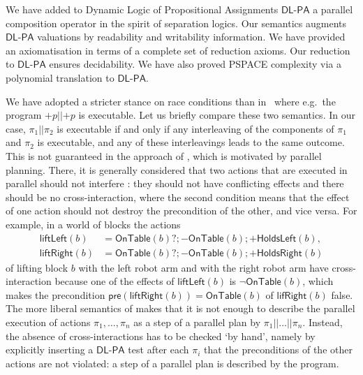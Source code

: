 \documentclass{llncs}
\newcommand{\pll}{ {||} }							%
\newcommand{\Dlpa}{\ensuremath{\mathsf{DL\text{-}PA}}\xspace}
\newcommand{\jb}[1]{\**\marginpar{\textbf{JB:} #1}}
\newcommand{\assgntop}[1]{{\mathtt {+} #1}}
\newcommand{\assgnbot}[1]{{\mathtt {-} #1}}
\begin{document}
We have added to Dynamic Logic of Propositional Assignments \Dlpa
a parallel composition operator in the spirit of separation logics. 
Our semantics augments \Dlpa valuations by readability and writability information. 
We have provided an axiomatisation in terms of a complete set of reduction axioms. 
Our reduction to \Dlpa ensures decidability. 
We have also proved PSPACE complexity via a polynomial translation to \Dlpa. 

We have adopted a stricter stance on race conditions than in~\cite{HerzigEtal-Ijcai19} %
where e.g.~the program $\assgntop p \pll \assgntop p$ is executable. 
Let us briefly compare these two semantics. 
In our case, $\pi_1 \pll \pi_2$ is executable if and only if any interleaving of the components of $\pi_1$ and $\pi_2$ is executable, and any of these interleavings leads to the same outcome. 
This is not guaranteed in the approach of \cite{HerzigEtal-Ijcai19}, which is motivated by parallel planning. 
There, it is generally considered that two actions that are executed in parallel should not interfere \cite{DBLP:journals/ai/BlumF97}:
they should not have conflicting effects and there should be no cross-interaction, where the second condition means that the effect of one action should not destroy the precondition of the other, and vice versa. 
For example, in a world of blocks the actions 
\begin{align*}
\mathsf{liftLeft}(b) &= \mathsf{OnTable}(b) ? ; \assgnbot{ \mathsf{OnTable}(b) } ; \assgntop{ \mathsf{HoldsLeft}(b) }  ,
\\
\mathsf{liftRight}(b) &= \mathsf{OnTable}(b) ? ; \assgnbot{ \mathsf{OnTable}(b) }  ; \assgntop{ \mathsf{HoldsRight}(b) } 
\end{align*}
of lifting block $b$ with the left robot arm and with the right robot arm have cross-interaction because 
one of the effects of $\mathsf{liftLeft}(b)$ is $\lnot \mathsf{OnTable}(b)$, which makes the precondition $\mathsf{pre}(\mathsf{liftRight}(b)) = \mathsf{OnTable}(b)$ of $\mathsf{lifRight}(b)$ false.
The more liberal semantics of \cite{HerzigEtal-Ijcai19} makes that it is not enough to describe the parallel execution of actions $\pi_1,\ldots,\pi_n$ as a step of a parallel plan by $\pi_1 \pll \ldots \pll \pi_n$. 
Instead, the absence of cross-interactions has to be checked `by hand', namely by explicitly inserting a \Dlpa test after each $\pi_i$ that the preconditions of the other actions are not violated: a step of a parallel plan is described by the program.
\end{document}

